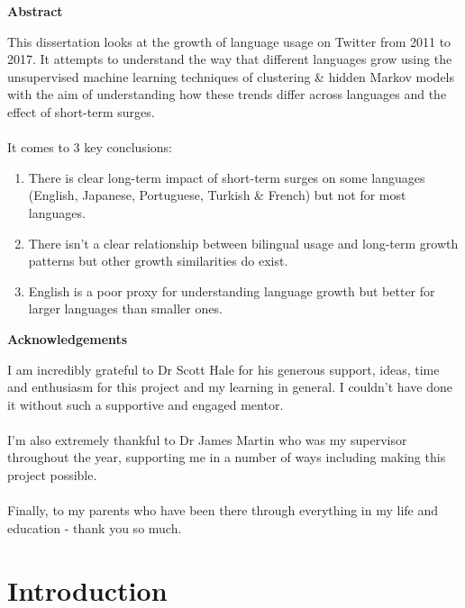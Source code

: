 \documentclass[12pt]{article}
\begin{document}
\begin{center}
\vspace*{2cm}
\textbf{\LARGE Abstract}
\end{center}
 \large This dissertation looks at the growth of language usage on Twitter from 2011 to 2017. It attempts to understand the way that different languages grow using the unsupervised machine learning techniques of clustering \& hidden Markov models with the aim of understanding how these trends differ across languages and the effect of short-term surges.
\\\\
It comes to 3 key conclusions:
\begin{enumerate}
\item There is  clear long-term impact of short-term surges on some languages (English, Japanese, Portuguese, Turkish \& French) but not for most languages.
\item There isn't a clear relationship between bilingual usage and long-term growth patterns but other growth similarities do exist.
\item English is a poor proxy for understanding language growth but better for larger languages than smaller ones.
\end{enumerate}
 \newpage

\begin{center}
\vspace*{2cm}
\textbf{\LARGE Acknowledgements}
\end{center}
 \large I am incredibly grateful to Dr Scott Hale for his generous support, ideas, time and enthusiasm for this project and my learning in general. I couldn't have done it without such a supportive and engaged mentor.
 \\\\
 I'm also extremely thankful to Dr James Martin who was my supervisor throughout the year, supporting me in a number of ways including making this project possible.
 \\\\
 Finally, to my parents who have been there through everything in my life and education - thank you so much.
 \newpage

\tableofcontents

\newpage

\section{Introduction}
\end{document}
